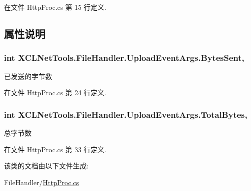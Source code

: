 在文件 Http\-Proc.\-cs 第 15 行定义.



\subsection{属性说明}
\hypertarget{class_x_c_l_net_tools_1_1_file_handler_1_1_upload_event_args_aeb753c87413d86d610121060635794e1}{
\subsubsection[{Bytes\-Sent}]{\setlength{\rightskip}{0pt plus 5cm}int X\-C\-L\-Net\-Tools.\-File\-Handler.\-Upload\-Event\-Args.\-Bytes\-Sent\hspace{0.3cm}{\ttfamily [get]}, {\ttfamily [set]}}}\label{class_x_c_l_net_tools_1_1_file_handler_1_1_upload_event_args_aeb753c87413d86d610121060635794e1}


已发送的字节数 



在文件 Http\-Proc.\-cs 第 24 行定义.

\hypertarget{class_x_c_l_net_tools_1_1_file_handler_1_1_upload_event_args_a874a8bc16016a3d11eb9aa52f9670eb4}{
\subsubsection[{Total\-Bytes}]{\setlength{\rightskip}{0pt plus 5cm}int X\-C\-L\-Net\-Tools.\-File\-Handler.\-Upload\-Event\-Args.\-Total\-Bytes\hspace{0.3cm}{\ttfamily [get]}, {\ttfamily [set]}}}\label{class_x_c_l_net_tools_1_1_file_handler_1_1_upload_event_args_a874a8bc16016a3d11eb9aa52f9670eb4}


总字节数 



在文件 Http\-Proc.\-cs 第 33 行定义.



该类的文档由以下文件生成\-:\begin{DoxyCompactItemize}
\item 
File\-Handler/\hyperlink{_http_proc_8cs}{Http\-Proc.\-cs}\end{DoxyCompactItemize}
